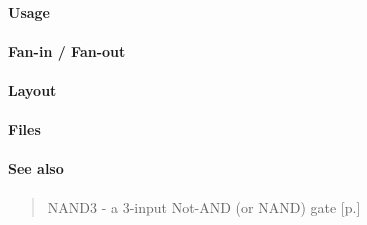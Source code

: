 \paragraph{Usage}

\paragraph{Fan-in / Fan-out}

\paragraph{Layout}

\paragraph{Files}

\paragraph{See also}
\begin{quote}
    NAND3 - a 3-input Not-AND (or NAND) gate [p.\pageref{NAND3}]
\end{quote}
